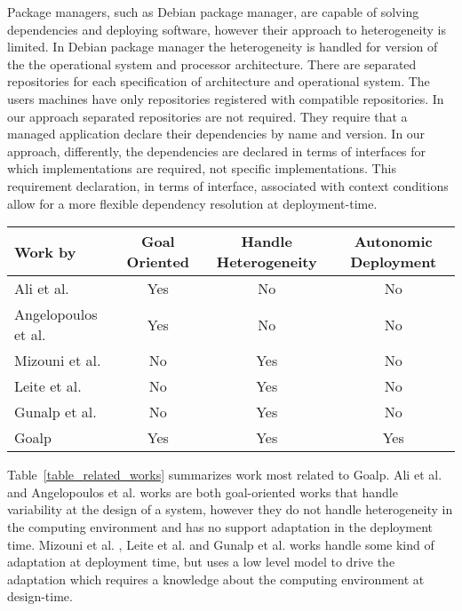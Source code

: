 Package managers, such as Debian package manager\cite{aoki_debian_2016}, are capable of solving dependencies and deploying software, however their approach to heterogeneity is limited. In Debian package manager the heterogeneity is handled for version of the the operational system and processor architecture. There are separated repositories for each specification of architecture and operational system. The users machines have only repositories registered with compatible repositories.
In our approach separated repositories are not required.
They require that a managed application declare their dependencies by name and version. In our approach, differently, the dependencies are declared in terms of interfaces for which implementations are required, not specific implementations.
This requirement declaration, in terms of interface, associated with context conditions allow for a more flexible dependency resolution at deployment-time.



\begin{table*}[!ht]
\centering
\caption{Comparing characteristic properties of selected approaches related to Goalp}
\label{table_related_works}
\begin{tabular}{p{4cm} ccc}
\toprule
Work by &
   Goal Oriented &
    Handle Heterogeneity &
    Autonomic Deployment \\
\midrule
Ali et al.\citep{ali_requirements-driven_2014} & \cellcolor{blue!10} Yes & No & No \\
Angelopoulos et al. \cite{angelopoulos_capturing_2015} & \cellcolor{blue!10}Yes & No & No \\
Mizouni et al. \citep{mizouni_framework_2014} & No & \cellcolor{blue!10} Yes & No \\
Leite et al. \citep{ferreira_leite_user_2014}  & No & \cellcolor{blue!10} Yes & No \\
Gunalp et al.\citep{gunalp_rondo_2015} & No & \cellcolor{blue!10} Yes  &  No\\
Goalp & \cellcolor{blue!10} Yes & \cellcolor{blue!10} Yes & \cellcolor{blue!10} Yes \\
\bottomrule
\end{tabular}
\end{table*}

Table~\ref{table_related_works} summarizes work most related to Goalp. Ali et al.\citep{ali_requirements-driven_2014} and Angelopoulos et al. \cite{angelopoulos_capturing_2015} works are both goal-oriented works that handle variability at the design of a system, however they do not handle heterogeneity in the computing environment and has no support adaptation in the deployment time. Mizouni et al. \citep{mizouni_framework_2014}, Leite et al. \citep{ferreira_leite_user_2014} and Gunalp et al.\citep{gunalp_rondo_2015} works handle some kind of adaptation at deployment time, but uses a low level model to drive the adaptation which requires a knowledge about the computing environment at design-time.



